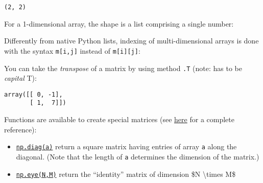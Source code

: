 \documentclass[english,serif,mathserif,xcolor=pdftex,dvipsnames,table]{beamer}
\begin{document}
\begin{verbatim}
(2, 2)
\end{verbatim}

For a 1-dimensional array, the shape is a list comprising a single
number:

\begin{Shaded}
\begin{Highlighting}[]
\end{Highlighting}
\end{Shaded}

Differently from native Python lists, indexing of multi-dimensional
arrays is done with the syntax \texttt{m{[}i,j{]}} instead of
\texttt{m{[}i{]}{[}j{]}}:

\begin{Shaded}
\begin{Highlighting}[]
\NormalTok{m[}\NormalTok{,}\NormalTok{] }\OperatorTok{=} 
\end{Highlighting}
\end{Shaded}

\begin{Shaded}
\begin{Highlighting}[]
\end{Highlighting}
\end{Shaded}

You can take the \emph{transpose} of a matrix by using method
\texttt{.T} (note: has to be \emph{capital} T):

\begin{Shaded}
\begin{Highlighting}[]
\end{Highlighting}
\end{Shaded}

\begin{verbatim}
array([[ 0, -1],
       [ 1,  7]])
\end{verbatim}

Functions are available to create special matrices (see
\href{https://docs.scipy.org/doc/numpy/reference/generated/numpy.eye.html\#numpy.eye}{here}
for a complete reference):

\begin{itemize}
\tightlist
\item
  \href{https://docs.scipy.org/doc/numpy/reference/generated/numpy.diag.html\#numpy.diag}{\texttt{np.diag(a)}}
  return a square matrix having entries of array \texttt{a} along the
  diagonal. (Note that the length of \texttt{a} determines the dimension
  of the matrix.)
\item
  \href{https://docs.scipy.org/doc/numpy/reference/generated/numpy.eye.html\#numpy.eye}{\texttt{np.eye(N,M)}}
  return the ``identity'' matrix of dimension \$N \textbackslash{}times
  M\$
\end{itemize}
\end{document}
